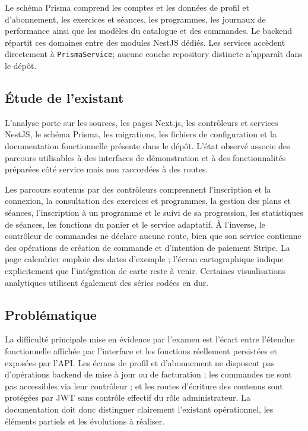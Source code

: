 ﻿\documentclass[12pt,a4paper]{report}
\begin{document}
Le schéma Prisma comprend les comptes et les données de profil et d'abonnement, les exercices et séances, les programmes, les journaux de performance ainsi que les modèles du catalogue et des commandes. Le backend répartit ces domaines entre des modules NestJS dédiés. Les services accèdent directement à \texttt{PrismaService}; aucune couche repository distincte n'apparaît dans le dépôt.

\subsection{Étude de l'existant}
\label{c1-s2-sub3}
L'analyse porte sur les sources, les pages Next.js, les contrôleurs et services NestJS, le schéma Prisma, les migrations, les fichiers de configuration et la documentation fonctionnelle présente dans le dépôt. L'état observé associe des parcours utilisables à des interfaces de démonstration et à des fonctionnalités préparées côté service mais non raccordées à des routes.

Les parcours soutenus par des contrôleurs comprennent l'inscription et la connexion, la consultation des exercices et programmes, la gestion des plans et séances, l'inscription à un programme et le suivi de sa progression, les statistiques de séances, les fonctions du panier et le service adaptatif. À l'inverse, le contrôleur de commandes ne déclare aucune route, bien que son service contienne des opérations de création de commande et d'intention de paiement Stripe. La page calendrier emploie des dates d'exemple ; l'écran cartographique indique explicitement que l'intégration de carte reste à venir. Certaines visualisations analytiques utilisent également des séries codées en dur.

\subsection{Problématique}
\label{c1-s2-sub4}
La difficulté principale mise en évidence par l'examen est l'écart entre l'étendue fonctionnelle affichée par l'interface et les fonctions réellement persistées et exposées par l'API. Les écrans de profil et d'abonnement ne disposent pas d'opérations backend de mise à jour ou de facturation ; les commandes ne sont pas accessibles via leur contrôleur ; et les routes d'écriture des contenus sont protégées par JWT sans contrôle effectif du rôle administrateur. La documentation doit donc distinguer clairement l'existant opérationnel, les éléments partiels et les évolutions à réaliser.
\end{document}
